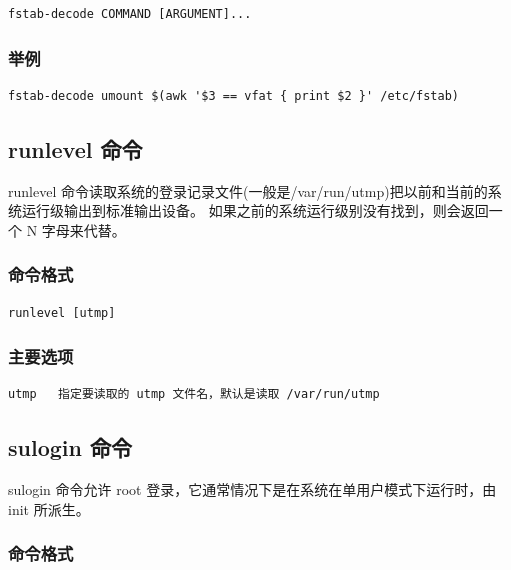 {\begin{shaded}\begin{verbatim}
fstab-decode COMMAND [ARGUMENT]...
\end{verbatim}\end{shaded}}
\subsubsection{举例}

{\begin{shaded}\begin{verbatim}
fstab-decode umount $(awk '$3 == vfat { print $2 }' /etc/fstab)
\end{verbatim}\end{shaded}}
\subsection{runlevel 命令}

runlevel
命令读取系统的登录记录文件(一般是/var/run/utmp)把以前和当前的系统运行级输出到标准输出设备。
如果之前的系统运行级别没有找到，则会返回一个 N 字母来代替。

\subsubsection{命令格式}

{\begin{shaded}\begin{verbatim}
runlevel [utmp]
\end{verbatim}\end{shaded}}
\subsubsection{主要选项}

{\begin{shaded}\begin{verbatim}
utmp   指定要读取的 utmp 文件名，默认是读取 /var/run/utmp
\end{verbatim}\end{shaded}}
\subsection{sulogin 命令}

sulogin 命令允许 root 登录，它通常情况下是在系统在单用户模式下运行时，由
init 所派生。

\subsubsection{命令格式}

